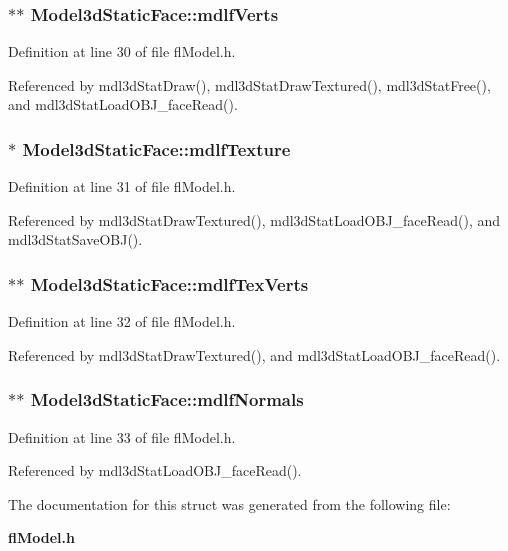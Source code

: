 \subsubsection{$\ast$$\ast$ {\bf Model3d\-Static\-Face::mdlf\-Verts}}\label{structModel3dStaticFace_26c9db0d65548610fc5a531893ce0472}




Definition at line 30 of file fl\-Model.h.

Referenced by mdl3d\-Stat\-Draw(), mdl3d\-Stat\-Draw\-Textured(), mdl3d\-Stat\-Free(), and mdl3d\-Stat\-Load\-OBJ\_\-face\-Read().
\subsubsection{$\ast$ {\bf Model3d\-Static\-Face::mdlf\-Texture}}\label{structModel3dStaticFace_be3cfa3180d1e90b4a7eeb55dad4cfcf}




Definition at line 31 of file fl\-Model.h.

Referenced by mdl3d\-Stat\-Draw\-Textured(), mdl3d\-Stat\-Load\-OBJ\_\-face\-Read(), and mdl3d\-Stat\-Save\-OBJ().
\subsubsection{$\ast$$\ast$ {\bf Model3d\-Static\-Face::mdlf\-Tex\-Verts}}\label{structModel3dStaticFace_7cd094a44e8688a5c2b915d802ebcd71}




Definition at line 32 of file fl\-Model.h.

Referenced by mdl3d\-Stat\-Draw\-Textured(), and mdl3d\-Stat\-Load\-OBJ\_\-face\-Read().
\subsubsection{$\ast$$\ast$ {\bf Model3d\-Static\-Face::mdlf\-Normals}}\label{structModel3dStaticFace_cb7e86c73dfc54dc369f3ba18ba17d1b}




Definition at line 33 of file fl\-Model.h.

Referenced by mdl3d\-Stat\-Load\-OBJ\_\-face\-Read().

The documentation for this struct was generated from the following file:\begin{CompactItemize}
\item 
{\bf fl\-Model.h}\end{CompactItemize}
